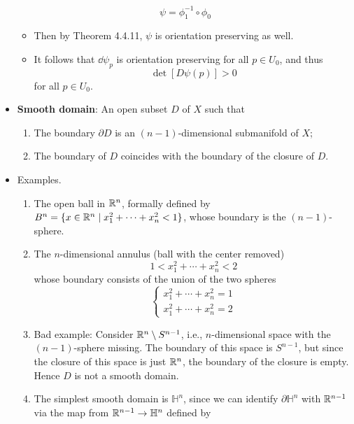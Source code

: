 \documentclass[../notes.tex]{subfiles}
\begin{document}
\begin{itemize}
    \begin{equation*}
        \psi = \phi_1^{-1}\circ\phi_0
    \end{equation*}
    \begin{itemize}
        \item Then by Theorem 4.4.11, $\psi$ is orientation preserving as well.
        \item It follows that $\dd\psi_p$ is orientation preserving for all $p\in U_0$, and thus
        \begin{equation*}
            \det[D\psi(p)] > 0
        \end{equation*}
        for all $p\in U_0$.
    \end{itemize}
    \item \textbf{Smooth domain}: An open subset $D$ of $X$ such that
    \begin{enumerate}
        \item The boundary $\partial D$ is an $(n-1)$-dimensional submanifold of $X$;
        \item The boundary of $D$ coincides with the boundary of the closure of $D$.
    \end{enumerate}
    \item Examples.
    \begin{enumerate}
        \item The open ball in $\mathbb{R}^n$, formally defined by $B^n=\{x\in\mathbb{R}^n\mid x_1^2+\cdots+x_n^2<1\}$, whose boundary is the $(n-1)$-sphere.
        \item The $n$-dimensional annulus (ball with the center removed)
        \begin{equation*}
            1 < x_1^2+\cdots+x_n^2 < 2
        \end{equation*}
        whose boundary consists of the union of the two spheres
        \begin{equation*}
            \begin{cases}
                x_1^2+\cdots+x_n^2 = 1\\
                x_1^2+\cdots+x_n^2 = 2
            \end{cases}
        \end{equation*}
        \item Bad example: Consider $\mathbb{R}^n\setminus S^{n-1}$, i.e., $n$-dimensional space with the $(n-1)$-sphere missing. The boundary of this space is $S^{n-1}$, but since the closure of this space is just $\mathbb{R}^n$, the boundary of the closure is empty. Hence $D$ is not a smooth domain.
        \item The simplest smooth domain is $\mathbb{H}^n$, since we can identify $\partial\mathbb{H}^n$ with $\mathbb{R}^{n-1}$ via the map from $\mathbb{R}^{n-1}\to\mathbb{H}^n$ defined by

\end{enumerate}
\end{itemize}
\end{document}
